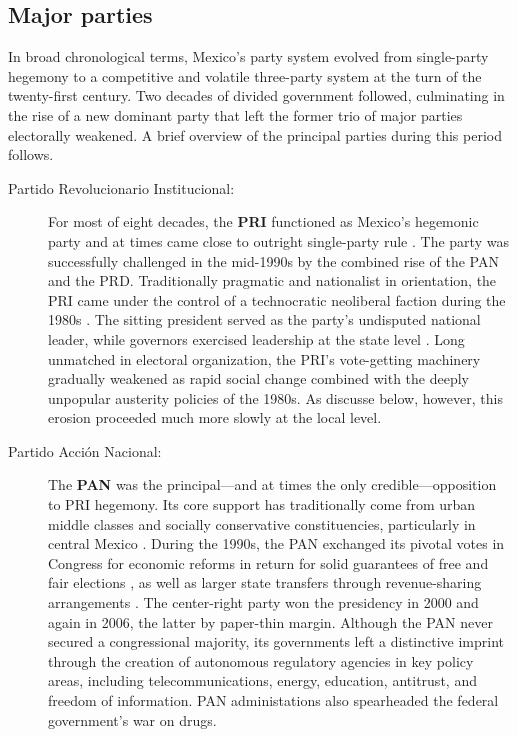 \documentclass[letter,12pt]{article}
\begin{document}
\subsection{Major parties}

In broad chronological terms, Mexico's party system evolved from single-party hegemony to a competitive and volatile three-party system at the turn of the twenty-first century. Two decades of divided government followed, culminating in the rise of a new dominant party that left the former trio of major parties electorally weakened. A brief overview of the principal parties during this period follows.

\begin{description}

\item[Partido Revolucionario Institucional:] For most of eight decades, the \textbf{PRI} functioned as Mexico's hegemonic party and at times came close to outright single-party rule \citep{molinar.1991a}. The party was successfully challenged in the mid-1990s by the combined rise of the PAN and the PRD. Traditionally pragmatic and nationalist in orientation, the PRI came under the control of a technocratic neoliberal faction during the 1980s \citep{dresser.Neolib1991}. The sitting president served as the party's undisputed national leader, while governors exercised leadership at the state level \citep{langston.2010}. Long unmatched in electoral organization, the PRI's vote-getting machinery gradually weakened as rapid social change combined with the deeply unpopular austerity policies of the 1980s. As discusse below, however, this erosion proceeded much more slowly at the local level.

\item[Partido Acción Nacional:] The \textbf{PAN} was the principal---and at times the only credible---opposition to PRI hegemony. Its core support has traditionally come from urban middle classes and socially conservative constituencies, particularly in central Mexico \citep{loaeza.pan.2010book}. During the 1990s, the PAN exchanged its pivotal votes in Congress for economic reforms in return for solid guarantees of free and fair elections \citep{cornelius.1996}, as well as larger state transfers through revenue-sharing arrangements \citep{diaz.cayeros.2006, shirk.PANbook.2005}. The center-right party won the presidency in 2000 and again in 2006, the latter by paper-thin margin. Although the PAN never secured a congressional majority, its governments left a distinctive imprint through the creation of autonomous regulatory agencies in key policy areas, including telecommunications, energy, education, antitrust, and freedom of information. PAN administations also spearheaded the federal government's war on drugs.


\end{description}
\end{document}
